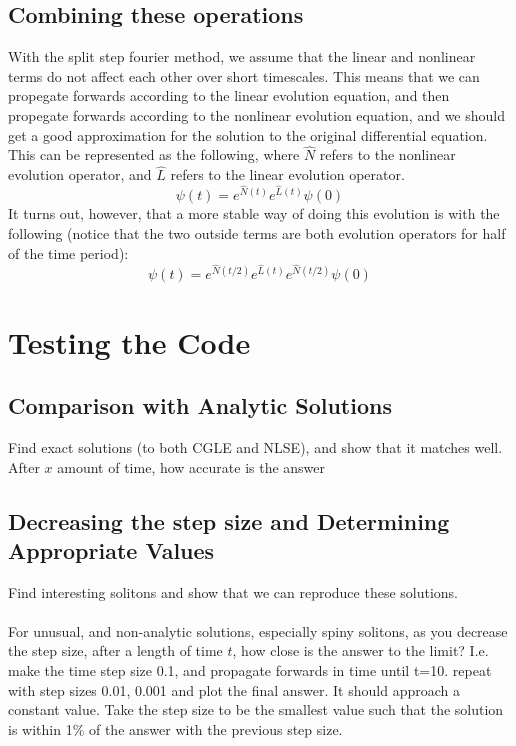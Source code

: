 \documentclass[a4paper,12pt]{report}
\begin{document}
\subsection{Combining these operations}
With the split step fourier method, we assume that the linear and nonlinear terms do not affect each other over short timescales. This means that we can propegate forwards according to the linear evolution equation, and then propegate forwards according to the nonlinear evolution equation, and we should get a good approximation for the solution to the original differential equation. This can be represented as the following, where $\hat N$ refers to the nonlinear evolution operator, and $\hat L$ refers to the linear evolution operator.
$$\psi(t)=e^{\hat N(t)}e^{\hat L(t)}\psi(0)$$ 
It turns out, however, that a more stable way of doing this evolution is with the following (notice that the two outside terms are both evolution operators for half of the time period):
$$\psi(t)=e^{\hat N(t/2)}e^{\hat L(t)}e^{\hat N(t/2)}\psi(0)$$ 




\section{Testing the Code}
\subsection{Comparison with Analytic Solutions}
Find exact solutions (to both CGLE and NLSE), and show that it matches well.
After $x$ amount of time, how accurate is the answer
\subsection{Decreasing the step size and Determining Appropriate Values}
Find interesting solitons and show that we can reproduce these solutions.\\\\
For unusual, and non-analytic solutions, especially spiny solitons, as you decrease the step size, after a length of time $t$, how close is the answer to the limit? I.e. make the time step size 0.1, and propagate forwards in time until t=10. repeat with step sizes 0.01, 0.001 and plot the final answer. It should approach a constant value. Take the step size to be the smallest value such that the solution is within 1\% of the answer with the previous step size.
\end{document}
